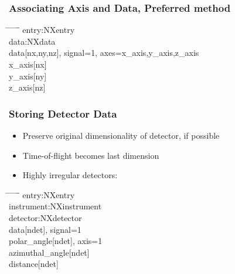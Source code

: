 \documentclass{beamer}
\begin{document}
\begin{frame} \frametitle{Associating Axis and Data, Preferred method}
\begin{tabbing}
\hspace*{1cm} \= \hspace*{1cm} \= \hspace*{1cm} \= \hspace*{1cm} \= \hspace*{1cm} \= \hspace*{1cm}\= \kill
entry:NXentry \\
 \>data:NXdata\\
 \> \> data[nx,ny,nz], signal=1, axes=x\_axis,y\_axis,z\_axis\\
 \> \> x\_axis[nx]\\
 \> \> y\_axis[ny]\\
 \> \> z\_axis[nz]\\
\end{tabbing}
\end{frame}


\begin{frame}
\frametitle{Storing Detector Data}
\begin{itemize}
\item Preserve original dimensionality of detector, if possible
\item Time-of-flight becomes last dimension
\item Highly irregular detectors:
\end{itemize}
\begin{tabbing}
\hspace*{1cm} \= \hspace*{1cm} \= \hspace*{1cm} \= \hspace*{1cm} \= \hspace*{1cm} \= \hspace*{1cm}\= \kill
entry:NXentry \\
\>instrument:NXinstrument\\
\> \>detector:NXdetector\\
\>  \> \> data[ndet], signal=1\\
\> \> \> polar\_angle[ndet], axis=1\\
\> \> \> azimuthal\_angle[ndet]\\
\> \> \> distance[ndet]\\
\end{tabbing}
\end{frame}
\end{document}
